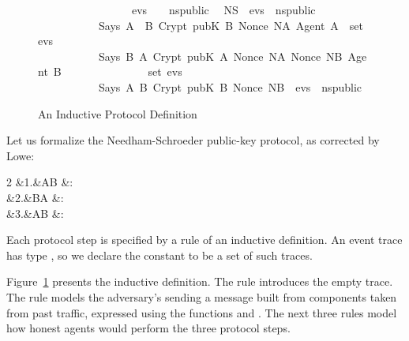 \begin{isabellebody}
\begin{figure}
\begin{isabelle}
\ \ \ \ \ \ \ \ \ \ \ \ \ \ \ \ {\isacharhash}\ evs{}\ \ {\isasymin}\ \ ns{\isacharunderscore}public{\isachardoublequoteclose}\isanewline
\isanewline
\isanewline
\ {\isacharbar}\ NS{}{\isacharcolon}\ \ {\isachardoublequoteopen}{\isasymlbrakk}evs{}\ {\isasymin}\ ns{\isacharunderscore}public{\isacharsemicolon}\isanewline
\ \ \ \ \ \ \ \ \ \ \ Says\ A\ \ B\ {\isacharparenleft}Crypt\ {\isacharparenleft}pubK\ B{\isacharparenright}\ {\isasymlbrace}Nonce\ NA{\isacharcomma}\ Agent\ A{\isasymrbrace}{\isacharparenright}\ {\isasymin}\ set\ evs{}{\isacharsemicolon}\isanewline
\ \ \ \ \ \ \ \ \ \ \ Says\ B{\isacharprime}\ A\ {\isacharparenleft}Crypt\ {\isacharparenleft}pubK\ A{\isacharparenright}\ {\isasymlbrace}Nonce\ NA{\isacharcomma}\ Nonce\ NB{\isacharcomma}\ Agent\ B{\isasymrbrace}{\isacharparenright}\isanewline
\ \ \ \ \ \ \ \ \ \ \ \ \ \ {\isasymin}\ set\ evs{}{\isasymrbrakk}\isanewline
\ \ \ \ \ \ \ \ \ \ {\isasymLongrightarrow}\ Says\ A\ B\ {\isacharparenleft}Crypt\ {\isacharparenleft}pubK\ B{\isacharparenright}\ {\isacharparenleft}Nonce\ NB{\isacharparenright}{\isacharparenright}\ {\isacharhash}\ evs{}\ {\isasymin}\ ns{\isacharunderscore}public{\isachardoublequoteclose}%
\end{isabelle}
\caption{An Inductive Protocol Definition}\label{fig:ns_public}
\end{figure}
%
\begin{isamarkuptext}%
Let us formalize the Needham-Schroeder public-key protocol, as corrected by
Lowe:
\begin{alignat*%
}{2}
  &1.&\quad  A\to B  &:  \\
  &2.&\quad  B\to A  &:  \\
  &3.&\quad  A\to B  &: 
\end{alignat*%
}

Each protocol step is specified by a rule of an inductive definition.  An
event trace has type , so we declare the constant
 to be a set of such traces.

Figure~\ref{fig:ns_public} presents the inductive definition.  The
 rule introduces the empty trace.  The  rule models the
adversary's sending a message built from components taken from past
traffic, expressed using the functions  and
. 
The next three rules model how honest agents would perform the three
protocol steps.  


\end{isamarkuptext}
\end{isabellebody}
